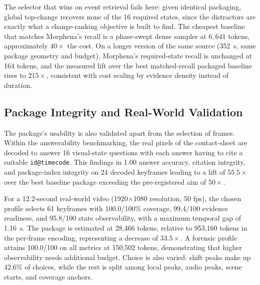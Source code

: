 \documentclass[conference]{IEEEtran}
\begin{document}
\begin{table}[t]
\centering
\small
\caption{Referred-state retrieval (16 required quiet states, 32 flash distractors).}
\label{tab:referred_state}
\end{table}

The selector that wins on event retrieval fails here: given identical packaging, global top-change recovers none of the 16 required states, since the distractors are exactly what a change-ranking objective is built to find. The cheapest baseline that matches Morphena's recall is a phase-swept dense sampler at $6{,}641$ tokens, approximately $40\times$ the cost. On a longer version of the same source (352~s, same package geometry and budget), Morphena's required-state recall is unchanged at 164 tokens, and the measured lift over the best matched-recall packaged baseline rises to $215\times$, consistent with cost scaling by evidence density instead of duration.

\subsection{Package Integrity and Real-World Validation}
The package’s usability is also validated apart from the selection of frames. Within the answerability benchmarking, the real pixels of the contact-sheet are decoded to answer 16 visual-state questions with each answer having to cite a suitable \texttt{id@timecode}. This findings in 1.00 answer accuracy, citation integrity, and package-index integrity on 24 decoded keyframes leading to a lift of $55.5\times$ over the best baseline package exceeding the pre-registered aim of $50\times$.

For a 12.2-second real-world video (1920$\times$1080 resolution, 50 fps), the chosen profile selects 61 keyframes with 100.0/100\% coverage, 99.4/100 evidence readiness, and 95.8/100 state observability, with a maximum temporal gap of 1.16~s. The package is estimated at 28{,}466 tokens, relative to 953{,}160 tokens in the per-frame encoding, representing a decrease of $33.5\times$. A forensic profile attains 100.0/100 on all metrics at 150{,}502 tokens, demonstrating that higher observability needs additional budget. Choice is also varied: shift peaks make up 42.6\% of choices, while the rest is split among local peaks, audio peaks, scene starts, and coverage anchors.
\end{document}

